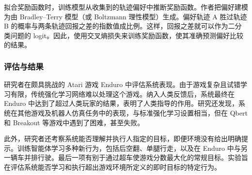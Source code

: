 拟合奖励函数时，训练模型从收集到的轨迹偏好中推断奖励函数。作者把偏好建模为由 Bradley–Terry 模型（或 Boltzmann 理性模型）生成。偏好轨迹 A 胜过轨迹 B 的概率与两条轨迹回报之差的指数值成比例。这样，回报之差就可以作为二分类问题的 logit。因此，使用交叉熵损失来训练奖励函数，使其准确预测偏好比较的结果。

\subsubsection{评估与结果}
研究者在颇具挑战的 Atari 游戏 Enduro 中评估系统表现。由于游戏复杂且试错学习有限，传统强化学习网络难以处理这个游戏。纳入人类反馈后，系统最终在 Enduro 中达到了超过人类玩家的结果，表明了人类指导的作用。研究还发现，系统在其他游戏及机器人仿真任务中的表现，与标准强化学习设置相当，但在 Qbert 和 Breakout 等游戏中遇到了困难，甚至失败。

此外，研究者还考察系统能否理解并执行人指定的目标，即便环境没有给出明确提示。训练智能体学习多种新行为，包括后空翻、单腿行走，以及在 Enduro 中与另一辆车并排行驶。最后一项有别于通过超车使游戏分数最大化的常规目标。实验旨在评估系统能否学习和执行超出游戏环境所定义的即时目标的特定行为。
